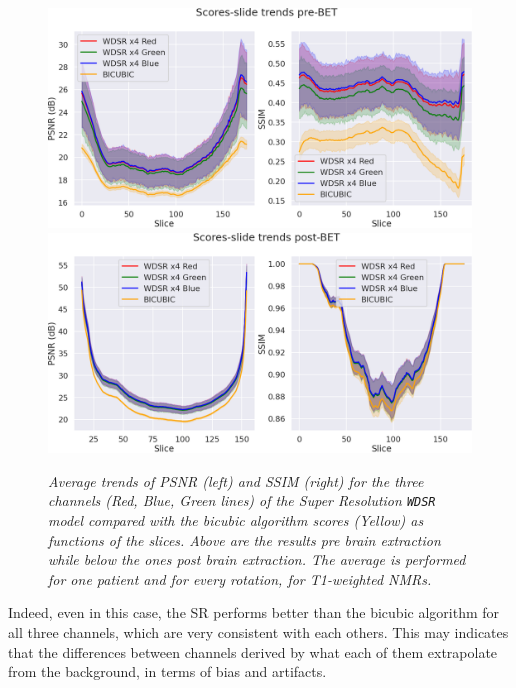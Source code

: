 \documentclass[12pt,a4paper]{report}
\begin{document}
\begin{figure}[H]
 \centering
 \includegraphics[scale=0.32]{./images/WDSR_score_t1_prebet.png}
 \includegraphics[scale=0.32]{./images/WDSR_score_slide_t1_betted.png}
 \caption{\it  Average trends of PSNR (left) and SSIM (right) for the three channels (Red, Blue, Green lines) of the Super Resolution {\tt WDSR} model compared with the bicubic algorithm scores (Yellow) as functions of the slices. Above are the results pre brain extraction while below the ones post brain extraction. The average is performed for one patient and for every rotation, for T1-weighted NMRs.}
 \label{fig:wdsr-bet-same-mask}
\end{figure}

Indeed, even in this case, the SR performs better than the bicubic algorithm for all three channels, which are very consistent with each others. This may indicates that the differences between channels derived by what each of them extrapolate from the background, in terms of bias and artifacts.
\end{document}
